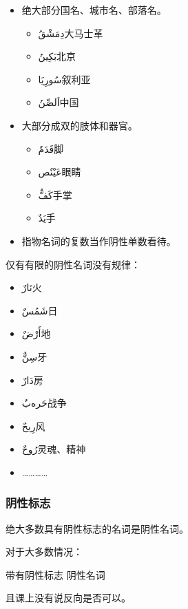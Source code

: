 \begin{itemize}
    \item 绝大部分国名、城市名、部落名。
    \begin{itemize}
        \item \ac{دِمَشْقُ}{大马士革}
        \item \ac{بَكِينُ}{北京}
        \item \ac{سُورِيَا}{叙利亚}
        \item \ac{اَلصِّنُ}{中国}
    \end{itemize}
    \item 大部分成双的肢体和器官。
    \begin{itemize}
        \item \ac{قَدَمٌ}{脚}
        \item \ac{عَيْنٌص}{眼睛}
        \item \ac{كَفٌّ}{手掌}
        \item \ac{يَدٌ}{手}
    \end{itemize}
    \item 指物名词的复数当作阴性单数看待。
\end{itemize}

仅有有限的阴性名词没有规律：

\begin{itemize}
    \item \ac{نَارٌ}{火}
    \item \ac{شَمُسٌ}{日}
    \item \ac{أَرْضٌ}{地}
    \item \ac{سِنٌّ}{牙}
    \item \ac{دَارٌ}{房}
    \item \ac{حَرەبٌ}{战争}
    \item \ac{رِيحٌ}{风}
    \item \ac{رُوحٌ}{灵魂、精神}
    \item …………
\end{itemize}

\subsubsection{阴性标志}

绝大多数具有阴性标志的名词是阴性名词。

\begin{note}
    对于大多数情况：
    
    \begin{center}
        带有阴性标志 \cto 阴性名词
    \end{center}

    且课上没有说反向是否可以。
\end{note}

